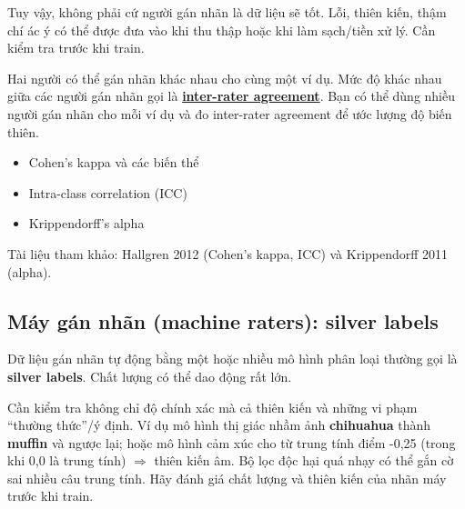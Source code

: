\documentclass[12pt,a4paper]{article}
\begin{document}
\begin{luuy}
Tuy vậy, không phải cứ người gán nhãn là dữ liệu sẽ tốt. Lỗi, thiên kiến, thậm chí ác ý có thể được đưa vào khi thu thập hoặc khi làm sạch/tiền xử lý. Cần kiểm tra trước khi train.
\end{luuy}

\begin{dinhnghia}[title={Inter-rater agreement}]
Hai người có thể gán nhãn khác nhau cho cùng một ví dụ. Mức độ khác nhau giữa các người gán nhãn gọi là \href{https://developers.google.com/machine-learning/glossary\#inter-rater-agreement}{\textbf{inter-rater agreement}}. Bạn có thể dùng nhiều người gán nhãn cho mỗi ví dụ và đo inter-rater agreement để ước lượng độ biến thiên.
\end{dinhnghia}

\begin{tinhchat}[title={Một số thước đo inter-rater agreement}]
\begin{itemize}
  \item Cohen's kappa và các biến thể
  \item Intra-class correlation (ICC)
  \item Krippendorff's alpha
\end{itemize}
Tài liệu tham khảo: Hallgren 2012 (Cohen's kappa, ICC) và Krippendorff 2011 (alpha).
\end{tinhchat}

\subsection{Máy gán nhãn (machine raters): silver labels}

\begin{dinhnghia}[title={Silver labels}]
Dữ liệu gán nhãn tự động bằng một hoặc nhiều mô hình phân loại thường gọi là \textbf{silver labels}. Chất lượng có thể dao động rất lớn.
\end{dinhnghia}

\begin{luuy}
Cần kiểm tra không chỉ độ chính xác mà cả thiên kiến và những vi phạm ``thường thức''/ý định. Ví dụ mô hình thị giác nhầm ảnh \textbf{chihuahua} thành \textbf{muffin} và ngược lại; hoặc mô hình cảm xúc cho từ trung tính điểm -0{,}25 (trong khi 0{,}0 là trung tính) \(\Rightarrow\) thiên kiến âm. Bộ lọc độc hại quá nhạy có thể gắn cờ sai nhiều câu trung tính. Hãy đánh giá chất lượng và thiên kiến của nhãn máy trước khi train.
\end{luuy}
\end{document}
